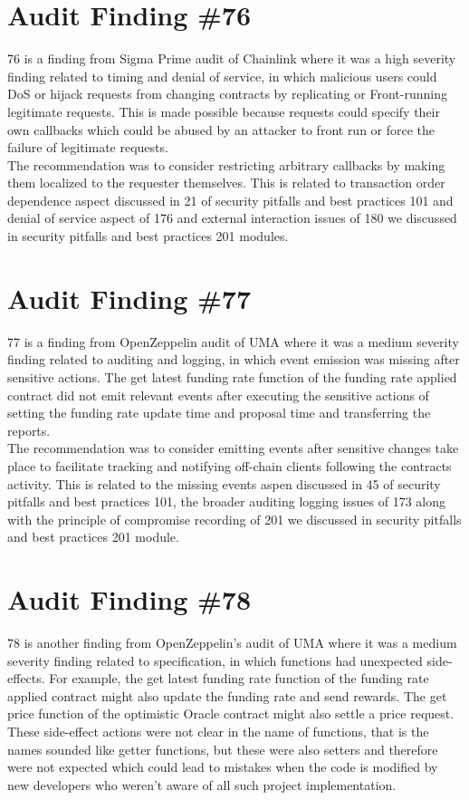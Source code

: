 \section{Audit Finding \#76}

76 is a finding from Sigma Prime audit of Chainlink where it was a high severity finding related to timing and denial of service, in which malicious users could DoS or hijack requests from changing contracts by replicating or Front-running legitimate requests. This is made possible because requests could specify their own callbacks which could be abused by an attacker to front run or force the failure of legitimate requests.\\

The recommendation was to consider restricting arbitrary callbacks by making them localized to the requester themselves. This is related to transaction order dependence aspect discussed in 21 of security pitfalls and best practices 101 and denial of service aspect of 176 and external interaction issues of 180 we discussed in security pitfalls and best practices 201 modules.

\section{Audit Finding \#77}

77 is a finding from OpenZeppelin audit of UMA where it was a medium severity finding related to auditing and logging, in which event emission was missing after sensitive actions. The get latest funding rate function of the funding rate applied contract did not emit relevant events after executing the sensitive actions of setting the funding rate update time and proposal time and transferring the reports.\\

The recommendation was to consider emitting events after sensitive changes take place to facilitate tracking and notifying off-chain clients following the contracts activity. This is related to the missing events aspen discussed in 45 of security pitfalls and best practices 101, the broader auditing logging issues of 173 along with the principle of compromise recording of 201 we discussed in security pitfalls and best practices 201 module.

\section{Audit Finding \#78}

78 is another finding from OpenZeppelin's audit of UMA where it was a medium severity finding related to specification, in which functions had unexpected side-effects. For example, the get latest funding rate function of the funding rate applied contract might also update the funding rate and send rewards. The get price function of the optimistic Oracle contract might also settle a price request. These side-effect actions were not clear in the name of functions, that is the names sounded like getter functions, but these were also setters and therefore were not expected which could lead to mistakes when the code is modified by new developers who weren't aware of all such project implementation.

